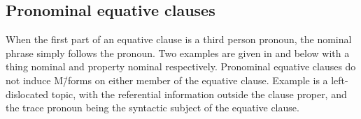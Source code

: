 %

\subsection{Pronominal equative clauses}\label{sec:ProEquCla}
When the first part of an equative clause is a third person pronoun,
the nominal phrase simply follows the pronoun.
Two examples are given in  and  below
with a thing nominal and property nominal respectively.
Pronominal equative clauses do not induce M\=/forms
on either member of the equative clause.
Example  is a left-dislocated topic,
with the referential information outside the clause proper,
and the trace pronoun being the syntactic subject of the equative clause.

